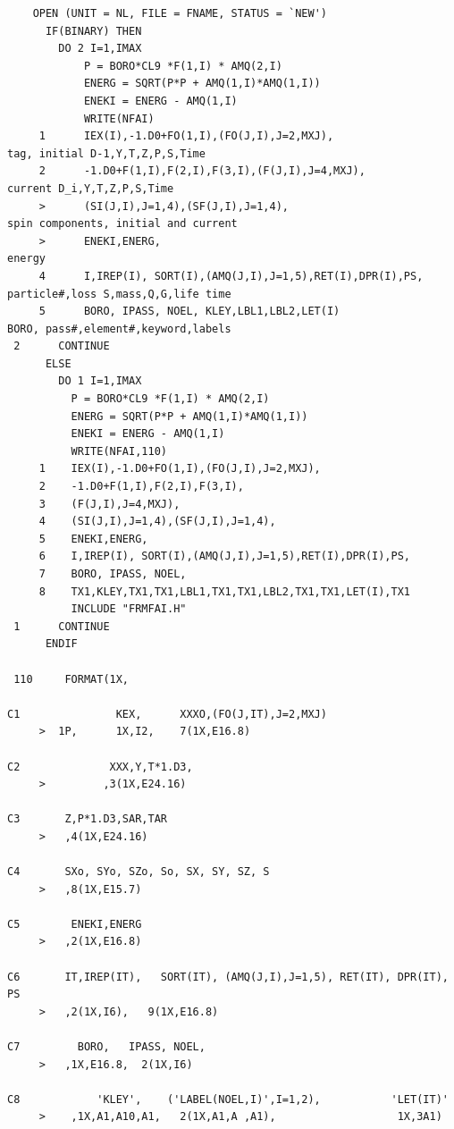 {\footnotesize
\begin{verbatim}
    OPEN (UNIT = NL, FILE = FNAME, STATUS = `NEW')
      IF(BINARY) THEN
        DO 2 I=1,IMAX
            P = BORO*CL9 *F(1,I) * AMQ(2,I)
            ENERG = SQRT(P*P + AMQ(1,I)*AMQ(1,I))
            ENEKI = ENERG - AMQ(1,I)
            WRITE(NFAI)
     1      IEX(I),-1.D0+FO(1,I),(FO(J,I),J=2,MXJ),                 tag, initial D-1,Y,T,Z,P,S,Time
     2      -1.D0+F(1,I),F(2,I),F(3,I),(F(J,I),J=4,MXJ),            current D_i,Y,T,Z,P,S,Time
     >      (SI(J,I),J=1,4),(SF(J,I),J=1,4),                        spin components, initial and current
     >      ENEKI,ENERG,                                            energy
     4      I,IREP(I), SORT(I),(AMQ(J,I),J=1,5),RET(I),DPR(I),PS,   particle#,loss S,mass,Q,G,life time
     5      BORO, IPASS, NOEL, KLEY,LBL1,LBL2,LET(I)                BORO, pass#,element#,keyword,labels
 2      CONTINUE
      ELSE
        DO 1 I=1,IMAX
          P = BORO*CL9 *F(1,I) * AMQ(2,I)
          ENERG = SQRT(P*P + AMQ(1,I)*AMQ(1,I))
          ENEKI = ENERG - AMQ(1,I)
          WRITE(NFAI,110)
     1    IEX(I),-1.D0+FO(1,I),(FO(J,I),J=2,MXJ),
     2    -1.D0+F(1,I),F(2,I),F(3,I),
     3    (F(J,I),J=4,MXJ),
     4    (SI(J,I),J=1,4),(SF(J,I),J=1,4),
     5    ENEKI,ENERG,
     6    I,IREP(I), SORT(I),(AMQ(J,I),J=1,5),RET(I),DPR(I),PS,
     7    BORO, IPASS, NOEL, 
     8    TX1,KLEY,TX1,TX1,LBL1,TX1,TX1,LBL2,TX1,TX1,LET(I),TX1
          INCLUDE "FRMFAI.H"
 1      CONTINUE
      ENDIF

 110     FORMAT(1X,

C1               KEX,      XXXO,(FO(J,IT),J=2,MXJ)
     >  1P,      1X,I2,    7(1X,E16.8)

C2              XXX,Y,T*1.D3,
     >         ,3(1X,E24.16)

C3       Z,P*1.D3,SAR,TAR 
     >   ,4(1X,E24.16)

C4       SXo, SYo, SZo, So, SX, SY, SZ, S
     >   ,8(1X,E15.7)

C5        ENEKI,ENERG
     >   ,2(1X,E16.8)

C6       IT,IREP(IT),   SORT(IT), (AMQ(J,I),J=1,5), RET(IT), DPR(IT), PS
     >   ,2(1X,I6),   9(1X,E16.8)

C7         BORO,   IPASS, NOEL,    
     >   ,1X,E16.8,  2(1X,I6)

C8            'KLEY',    ('LABEL(NOEL,I)',I=1,2),           'LET(IT)'
     >    ,1X,A1,A10,A1,   2(1X,A1,A ,A1),                   1X,3A1)
\end{verbatim}}
\medskip

